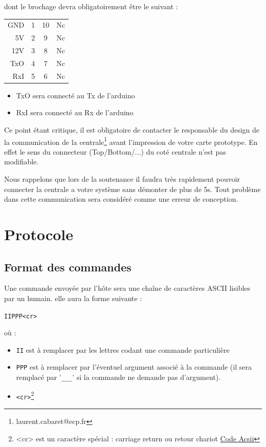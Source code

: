 \documentclass[a4paper, 10pt]{article} %
\begin{document}
dont le brochage devra obligatoirement être le suivant :

\begin{center}
\begin{tabular}{r|c||c|l}
GND&1&10&Nc\\
5V&2&9&Nc\\
12V&3&8&Nc\\
TxO&4&7&Nc\\
RxI&5&6&Nc\\
\end{tabular}
\end{center}


\begin{itemize}
\item TxO sera connecté au Tx de l'arduino
\item RxI sera connecté au Rx de l'arduino
\end{itemize}


Ce point étant critique, il est obligatoire de contacter le responsable du design de la communication de la centrale\footnote{laurent.cabaret@ecp.fr} avant l'impression  de votre carte prototype.
En effet le sens du connecteur (Top/Bottom/...) du coté centrale n'est pas modifiable.

Nous rappelons que lors de la soutenance il faudra très rapidement pouvoir connecter la centrale a votre système sans démonter de plus de 5s. Tout problème dans cette communication sera considéré comme une erreur de conception.

\section{Protocole}

\subsection{Format des commandes}

Une commande envoyée par l'hôte sera une chaîne de caractères ASCII lisibles par un humain. elle aura la
forme suivante :
\begin{center}
  \verb|IIPPP<cr>|
\end{center}

où :
\begin{itemize}
  \item \verb|II| est à remplacer par les lettres codant une commande particulière
  \item \verb|PPP| est à remplacer par l'éventuel argument associé à la commande (il sera remplacé par '\verb|___|' si
    la commande ne demande pas d'argument).
  \item \verb|<cr>|\footnote{<cr> est un caractère spécial : carriage return ou retour chariot \href{http://fr.wikipedia.org/wiki/American_Standard_Code_for_Information_Interchange}{Code Acsii}}
\end{itemize}
\end{document}
